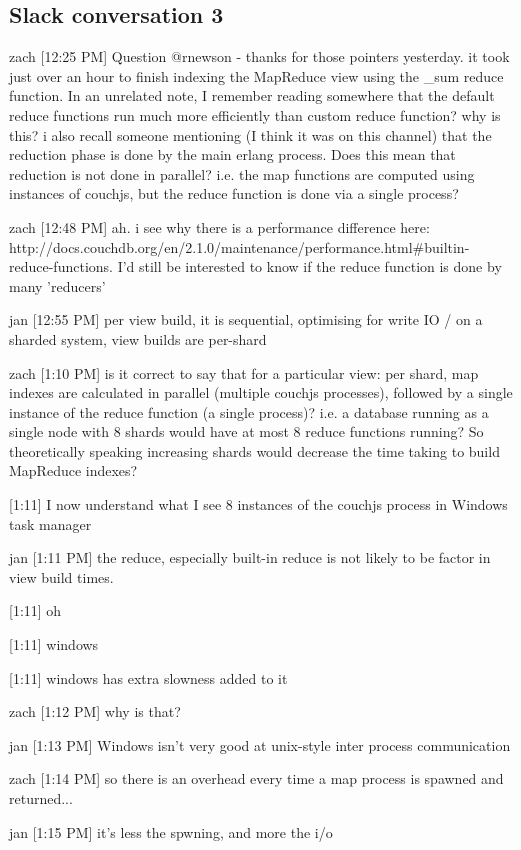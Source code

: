 \subsection{Slack conversation 3}
\label{appendix:slack3}

zach [12:25 PM]
Question @rnewson - thanks for those pointers yesterday. it took just over an hour to finish indexing the MapReduce view using the \_sum reduce function. In an unrelated note, I remember reading somewhere that the default reduce functions run much more efficiently than custom reduce function? why is this? i also recall someone mentioning (I think it was on this channel) that the reduction phase is done by the main erlang process. Does this mean that reduction is not done in parallel? i.e. the map functions are computed using instances of couchjs, but the reduce function is done via a single process?


zach [12:48 PM]
ah. i see why there is a performance difference here: http://docs.couchdb.org/en/2.1.0/maintenance/performance.html#builtin-reduce-functions. I'd still be interested to know if the reduce function is done by many 'reducers'


jan [12:55 PM]
per view build, it is sequential, optimising for write IO / on a sharded system, view builds are per-shard


zach [1:10 PM]
is it correct to say that for a particular view: per shard, map indexes are calculated in parallel (multiple couchjs processes), followed by a single instance of the reduce function (a single process)? i.e. a database running as a single node with 8 shards would have at most 8 reduce functions running? So theoretically speaking increasing shards would decrease the time taking to build MapReduce indexes?


[1:11]
I now understand what I see 8 instances of the couchjs process in Windows task manager


jan [1:11 PM]
the reduce, especially built-in reduce is not likely to be factor in view build times.


[1:11]
oh


    [1:11]
windows


    [1:11]
windows has extra slowness added to it


zach [1:12 PM]
why is that?


jan [1:13 PM]
Windows isn’t very good at unix-style inter process communication


zach [1:14 PM]
so there is an overhead every time a map process is spawned and returned...


jan [1:15 PM]
it’s less the spwning, and more the i/o